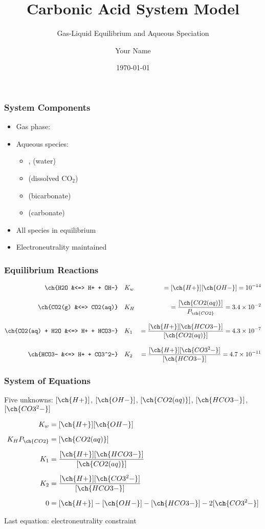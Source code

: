 \documentclass{beamer}
\title{Carbonic Acid System Model}
\subtitle{Gas-Liquid Equilibrium and Aqueous Speciation}
\author{Your Name}
\date{\today}
\begin{document}
\frame{\titlepage}

\begin{frame}
\frametitle{System Components}
\begin{itemize}
\item Gas phase: 
\item Aqueous species:
\begin{itemize}
\item {},  (water)
\item {} (dissolved CO$_2$)
\item {} (bicarbonate)
\item {} (carbonate)
\end{itemize}
\item All species in equilibrium
\item Electroneutrality maintained
\end{itemize}
\end{frame}

\begin{frame}
\frametitle{Equilibrium Reactions}
\begin{align}
\ch{H2O &<=> H+ + OH-} \quad &K_w &= [\ch{H+}][\ch{OH-}] = 10^{-14} \\[0.3cm]
\ch{CO2(g) &<=> CO2(aq)} \quad &K_H &= \frac{[\ch{CO2(aq)}]}{P_{\ch{CO2}}} = 3.4 \times 10^{-2} \\[0.3cm]
\ch{CO2(aq) + H2O &<=> H+ + HCO3-} \quad &K_1 &= \frac{[\ch{H+}][\ch{HCO3-}]}{[\ch{CO2(aq)}]} = 4.3 \times 10^{-7} \\[0.3cm]
\ch{HCO3- &<=> H+ + CO3^2-} \quad &K_2 &= \frac{[\ch{H+}][\ch{CO3^2-}]}{[\ch{HCO3-}]} = 4.7 \times 10^{-11}
\end{align}
\end{frame}

\begin{frame}
\frametitle{System of Equations}
Five unknowns: $[\ch{H+}]$, $[\ch{OH-}]$, $[\ch{CO2(aq)}]$, $[\ch{HCO3-}]$, $[\ch{CO3^2-}]$

\begin{align}
K_w &= [\ch{H+}][\ch{OH-}] \\[0.2cm]
K_H P_{\ch{CO2}} &= [\ch{CO2(aq)}] \\[0.2cm]
K_1 &= \frac{[\ch{H+}][\ch{HCO3-}]}{[\ch{CO2(aq)}]} \\[0.2cm]
K_2 &= \frac{[\ch{H+}][\ch{CO3^2-}]}{[\ch{HCO3-}]} \\[0.2cm]
0 &= [\ch{H+}] - [\ch{OH-}] - [\ch{HCO3-}] - 2[\ch{CO3^2-}]
\end{align}

Last equation: electroneutrality constraint
\end{frame}
\end{document}
